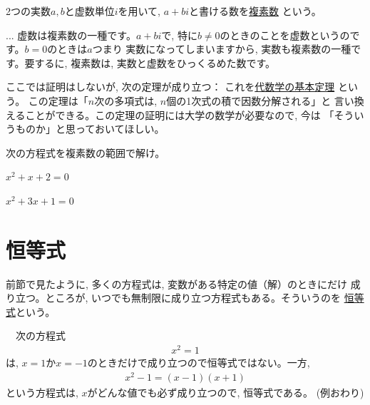 2つの実数$a, b$と虚数単位$i$を用いて, $a+bi$と書ける数を\underline{複素数}
という。

\begin{faq}{\small{} ... 虚数は複素数の一種です。$a+bi$で,
特に$b\neq0$のときのことを虚数というのです。$b=0$のときは$a$つまり
実数になってしまいますから, 実数も複素数の一種です。要するに, 複素数は, 
実数と虚数をひっくるめた数です。}\end{faq}

ここでは証明はしないが, 次の定理が成り立つ：
これを\underline{代数学の基本定理}
という。
この定理は「$n$次の多項式は, $n$個の1次式の積で因数分解される」と
言い換えることができる。この定理の証明には大学の数学が必要なので, 今は
「そういうものか」と思っておいてほしい。\mv

\begin{q}\label{q:alg_eq_complex0} 次の方程式を複素数の範囲で解け。
\begin{edaenumerate}
\item $x^2+x+2=0$
\item $x^2+3x+1=0$
\end{edaenumerate}
\end{q}
\hv

\section{恒等式}

前節で見たように, 多くの方程式は, 変数がある特定の値（解）のときにだけ
成り立つ。ところが, いつでも無制限に成り立つ方程式もある。そういうのを
\underline{恒等式}という。

\begin{exmpl}　次の方程式
\begin{eqnarray}x^2=1\end{eqnarray}
は, $x=1$か$x=-1$のときだけで成り立つので恒等式ではない。一方, 
\begin{eqnarray}
x^2-1=(x-1)(x+1)
\end{eqnarray}
という方程式は, $x$がどんな値でも必ず成り立つので, 恒等式である。
(例おわり)\end{exmpl}

